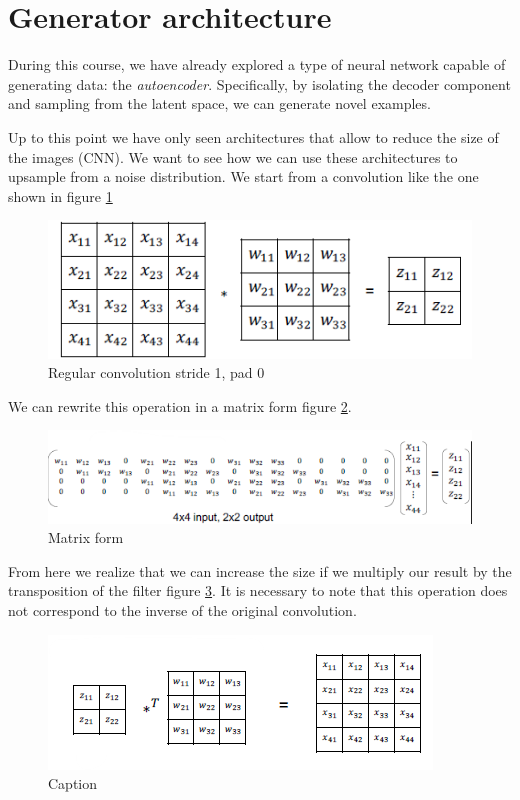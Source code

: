 \section{Generator architecture}
During this course, we have already explored a type of neural network capable of generating data: the 
\textit{autoencoder}. Specifically, by isolating the decoder component and sampling from the latent space,
we can generate novel examples.

Up to this point we have only seen architectures that allow to reduce the size of the images (CNN). We
want to see how we can use these architectures to upsample from  a noise distribution. We start from a 
convolution like the one shown in figure \ref{fig:reg-conv}

\begin{figure}[!ht]
    \centering
    \includegraphics[width=0.5\linewidth]{img/GAN/RegularConv.png}
    \caption{Regular convolution stride 1, pad 0}
    \label{fig:reg-conv}
\end{figure}

We can rewrite this operation in a matrix form figure \ref{fig:conmat}.

\begin{figure}[!ht]
    \centering
    \includegraphics[width=0.5\linewidth]{img/GAN/matrix-vector.png}
    \caption{Matrix form}
    \label{fig:conmat}
\end{figure}

From here we realize that we can increase the size if we multiply our result by the transposition of the 
filter figure \ref{fig:traConv}. It is necessary to note that this operation does not correspond to the inverse of the original convolution.

\begin{figure}[!ht]
    \centering
    \includegraphics[width=0.5\linewidth]{img/GAN/transposeConv.png}
    \caption{Caption}
    \label{fig:traConv}
\end{figure}


